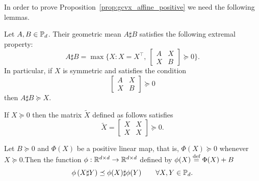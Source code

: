 \documentclass[twoside,11pt]{article}
\begin{document}
In order to prove Proposition~\ref{prop:gcvx_affine_positive}
we need the following lemmas.



\begin{lemma}\label{lemma:extremal_characterization}
        Let $A, B \in \mathbb{P}_d$. Their geometric mean $A \sharp B$ satisfies the following extremal property: 
        \[
        A \sharp B = \max \{X: X = X^\top, \ \begin{bmatrix}
            A &X \\
            X &B
        \end{bmatrix} \succeq 0\}.
        \]
        In particular, if $X$ is symmetric and satisfies the condition 
        \[
        \begin{bmatrix}
            A &X \\
            X &B
        \end{bmatrix} \succeq 0
        \]
        then $A \sharp B \succeq X$.
    \end{lemma}


\begin{lemma}\label{lemma:psd_block_matrix}
        If $X \succeq 0$ then the matrix $\tilde{X}$ defined as follows satisfies 
        \[
        \tilde{X} = \begin{bmatrix}
            X & X  \\
            X & X
        \end{bmatrix} \succeq 0.
        \]
    \end{lemma}

\begin{lemma}\label{positive_linear_gm}
        Let $B \succeq 0$ and $\Phi(X)$ be a positive linear map, that is, $\Phi(X) \succeq 0 $ whenever $X \succeq 0$.Then the function $\phi: \mathbb{R}^{d \times d} \to \mathbb{R}^{d \times d}$ defined by $\phi(X) \stackrel{\text{def}}{=} \Phi(X) + B$
        \[
        \phi\left(X \sharp Y\right) \preceq \phi(X) \sharp \phi(Y) \qquad \forall X,Y \in \mathbb{P}_d.
        \]
    \end{lemma}
\end{document}

